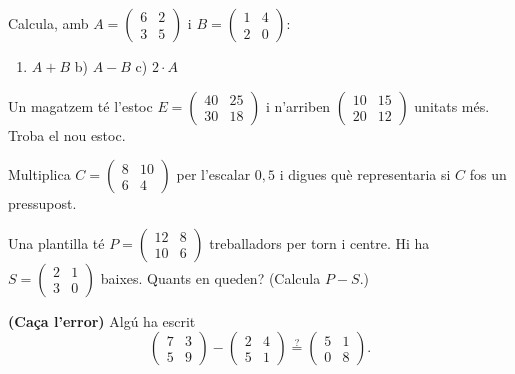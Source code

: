 \begin{exercicis}
\begin{exlist}
  \item Calcula, amb
        $A=\begin{pmatrix} 6 & 2 \\ 3 & 5 \end{pmatrix}$ i
        $B=\begin{pmatrix} 1 & 4 \\ 2 & 0 \end{pmatrix}$:
        \begin{enumerate}[label=\alph*), leftmargin=1.6em, topsep=2pt]
          \item $A+B$ \quad b) $A-B$ \quad c) $2\cdot A$
        \end{enumerate}
  \item Un magatzem té l'estoc $E=\begin{pmatrix} 40 & 25 \\ 30 & 18 \end{pmatrix}$
        i n'arriben $\begin{pmatrix} 10 & 15 \\ 20 & 12 \end{pmatrix}$ unitats més.
        Troba el nou estoc.
  \item Multiplica $C=\begin{pmatrix} 8 & 10 \\ 6 & 4 \end{pmatrix}$ per l'escalar
        $0{,}5$ i digues què representaria si $C$ fos un pressupost.
  \item Una plantilla té $P=\begin{pmatrix} 12 & 8 \\ 10 & 6 \end{pmatrix}$
        treballadors per torn i centre. Hi ha $S=\begin{pmatrix} 2 & 1 \\ 3 & 0 \end{pmatrix}$
        baixes. Quants en queden? (Calcula $P-S$.)
  \item \textbf{(Caça l'error)} Algú ha escrit
        \[ \begin{pmatrix} 7 & 3 \\ 5 & 9 \end{pmatrix}-\begin{pmatrix} 2 & 4 \\ 5 & 1 \end{pmatrix}
           \overset{?}{=}\begin{pmatrix} 5 & 1 \\ 0 & 8 \end{pmatrix}. \]

\end{exlist}
\end{exercicis}
